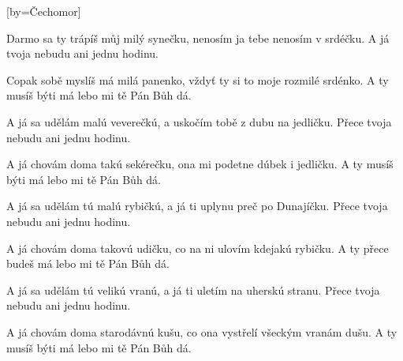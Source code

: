 [by={Čechomor}]

\beginverse{}
Darmo sa ty trápíš můj milý synečku,
nenosím ja tebe nenosím v srdéčku.
A já tvoja nebudu ani jednu hodinu.
\endverse{}

\beginverse{}
\chordsoff{}
Copak sobě myslíš má milá panenko,
vždyť ty si to moje rozmilé srdénko.
A ty musíš býti má lebo mi tě Pán Bůh dá.
\chordson{}
\endverse{}

\beginverse{}
\chordsoff{}
A já sa udělám malú veverečkú,
a uskočím tobě z dubu na jedličku.
Přece tvoja nebudu ani jednu hodinu.
\chordson{}
\endverse{}

\beginverse{}
\chordsoff{}
A já chovám doma takú sekérečku,
ona mi podetne dúbek i jedličku.
A ty musíš býti má lebo mi tě Pán Bůh dá.
\chordson{}
\endverse{}

\beginverse{}
\chordsoff{}
A já sa udělám tú malú rybičkú,
a já ti uplynu preč po Dunajíčku.
Přece tvoja nebudu ani jednu hodinu.
\chordson{}
\endverse{}

\beginverse{}
\chordsoff{}
A já chovám doma takovú udičku,
co na ni ulovím kdejakú rybičku.
A ty přece budeš má lebo mi tě Pán Bůh dá.
\chordson{}
\endverse{}

\beginverse{}
\chordsoff{}
A já sa udělám tú velikú vranú,
a já ti uletím na uherskú stranu.
Přece tvoja nebudu ani jednu hodinu.
\chordson{}
\endverse{}

\beginverse{}
\chordsoff{}
A já chovám doma starodávnú kušu,
co ona vystřelí všeckým vranám dušu.
A ty musíš býti má lebo mi tě Pán Bůh dá.
\chordson{}
\endverse{}

